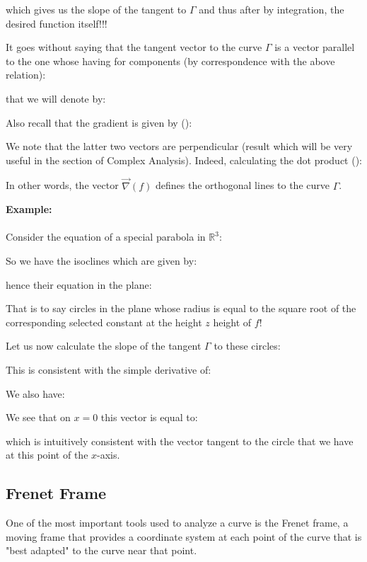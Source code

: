 {	which gives us the slope of the tangent to $\Gamma$ and thus after by integration, the desired function itself!!!
	
	It goes without saying that the tangent vector to the curve $\Gamma$ is a vector parallel to the one whose having for components (by correspondence with the above relation):
	
	that we will denote by:
	
	Also recall that the gradient is given by ():
	
	We note that the latter two vectors are perpendicular (result which will be very useful in the section of Complex Analysis). Indeed, calculating the dot product ():
	
	In other words, the vector $\vec{\nabla}(f)$ defines the orthogonal lines to the curve $\Gamma$.
	\begin{tcolorbox}[colframe=black,colback=white,sharp corners]
	\textbf{{\Large {}}Example:}\\\\
	Consider the equation of a special parabola in $\mathbb{R}^3$:
	
	So we have the isoclines which are given by:
	
	hence their equation in the plane:
	
	That is to say circles in the plane whose radius is equal to the square root of the corresponding selected constant at the height $z$ height of $f$!
	
	Let us now calculate the slope of the tangent $\Gamma$ to these circles:
	
	This is consistent with the simple derivative of:
	
	We also have:
	
	We see that on $x=0$ this vector is equal to:
	
	which is intuitively consistent with the vector tangent to the circle that we have at this point of the $x$-axis.
	\end{tcolorbox}
	
	\pagebreak
	\subsection{Frenet Frame}	
	One of the most important tools used to analyze a curve is the Frenet frame, a moving frame that provides a coordinate system at each point of the curve that is "best adapted" to the curve near that point.
	
}
